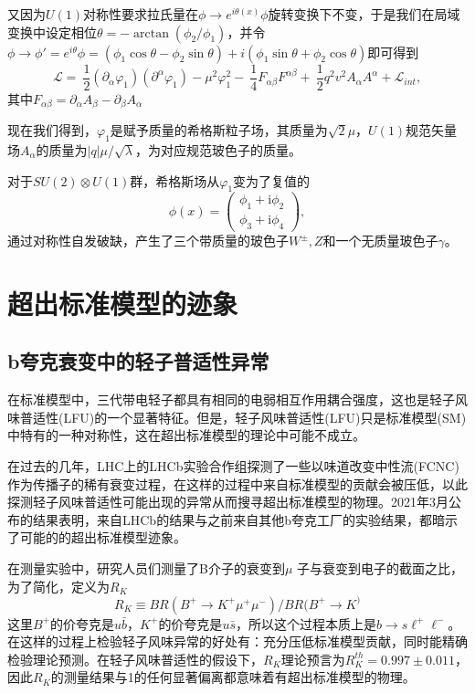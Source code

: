 又因为$U(1)$对称性要求拉氏量在$\phi\to e^{i\theta(x)}\phi$旋转变换下不变，于是我们在局域变换中设定相位$\theta=-\arctan{(\phi_2/\phi_1)}$，并令$\phi\to \phi'=e^{i\theta}\phi=(\phi_1\cos{\theta}-\phi_2\sin{\theta})
+i(\phi_1\sin{\theta}+\phi_2\cos{\theta})$即可得到
\begin{equation}
    \mathscr{L}=\ \frac{1}{2} (\partial_{\alpha}\varphi_1)(\partial^{\alpha}\varphi_1) 
-\mu^2\varphi_1^2  -\ \frac{1}{4}F_{\alpha\beta}F^{\alpha\beta} +\ \frac{1}{2}q^2 v^2 A_{\alpha}A^{\alpha} +\mathscr{L}_{int},
\end{equation}
其中$F_{\alpha\beta}=\partial_\alpha A_\beta-\partial_\beta A_\alpha$

现在我们得到，$\varphi_1$是赋予质量的希格斯粒子场，其质量为$\sqrt{2}\mu$，$U(1)$规范矢量场$A_\alpha$的质量为$|q|\mu/\sqrt{\lambda}$，为对应规范玻色子的质量。

对于$SU(2)\otimes U(1)$群，希格斯场从$\varphi_1$变为了复值的
\begin{equation}
    \phi (x) ={\left ( \begin{matrix} \phi_1 + \mathrm{i} \phi_2\\ \phi_3 + \mathrm{i} \phi_4 \end{matrix} \right )},
\end{equation}
通过对称性自发破缺，产生了三个带质量的玻色子$W^\pm,Z$和一个无质量玻色子$\gamma$。

\section{超出标准模型的迹象}
\subsection{b夸克衰变中的轻子普适性异常}
在标准模型中，三代带电轻子都具有相同的电弱相互作用耦合强度，这也是轻子风味普适性(LFU)的一个显著特征。但是，轻子风味普适性(LFU)只是标准模型(SM)中特有的一种对称性，这在超出标准模型的理论中可能不成立。

在过去的几年，LHC上的LHCb实验合作组探测了一些以味道改变中性流(FCNC)作为传播子的稀有衰变过程\cite{LFU_violation}，在这样的过程中来自标准模型的贡献会被压低，以此探测轻子风味普适性可能出现的异常从而搜寻超出标准模型的物理。2021年3月公布的结果\cite{LFU_violation}表明，来自LHCb的结果与之前来自其他b夸克工厂的实验结果，都暗示了可能的的超出标准模型迹象。

在测量实验中，研究人员们测量了B介子的衰变到$\mu$
子与衰变到电子的截面之比，为了简化，定义为$R_K$
\begin{equation}
    R_K\equiv BR(B^+\to K^+\mu^+\mu^-)/BR(B^+\to K^)
\end{equation}
这里$B^+$的价夸克是$u\bar{b}$，$K^+$的价夸克是$u\bar{s}$，所以这个过程本质上是$b\to s\ell^+\ell^-$。在这样的过程上检验轻子风味异常的好处有：充分压低标准模型贡献，同时能精确检验理论预测。在轻子风味普适性的假设下，$R_K$理论预言为$R_K^{th}=0.997\pm 0.011$，因此$R_K$的测量结果与1的任何显著偏离都意味着有超出标准模型的物理。

